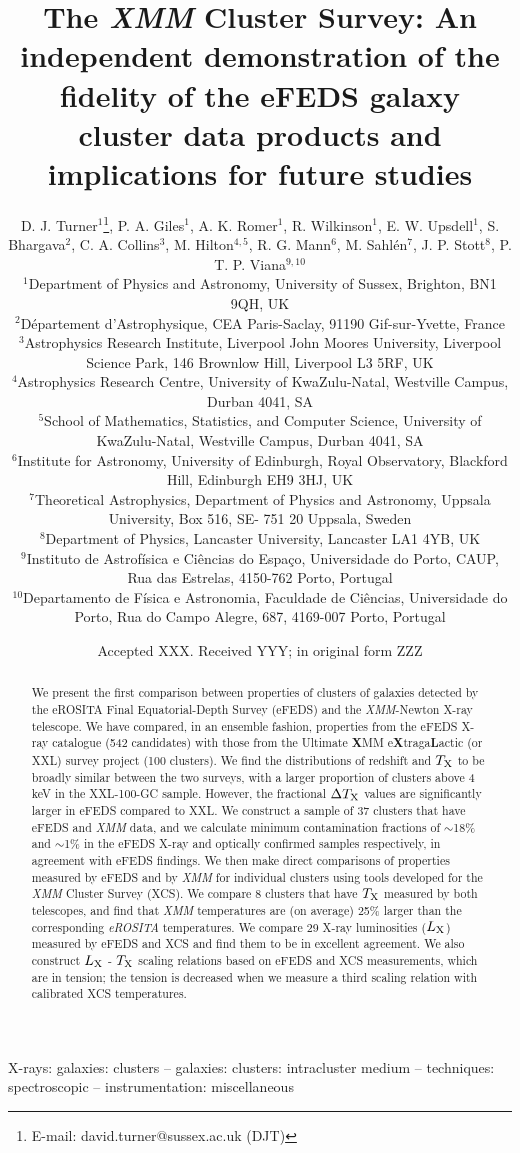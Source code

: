 \documentclass[fleqn,usenatbib]{mnras}
\title[XCS: Demonstrating the fidelity of eFEDS data products when applied to clusters of galaxies]{The {\em XMM} Cluster Survey: An independent demonstration of the fidelity of the eFEDS galaxy cluster data products and implications for future studies}
\author[D. J. Turner et al.]
{D. J. Turner$^{1}$\thanks{E-mail: david.turner@sussex.ac.uk (DJT)}\orcidA{},
P. A. Giles$^{1}$\orcidB{},
A. K. Romer$^{1}$\orcidC{},
R. Wilkinson$^{1}$\orcidD{},
E. W. Upsdell$^{1}$\orcidG{},
S. Bhargava$^{2}$,
\newauthor
C. A. Collins$^{3}$,
M. Hilton$^{4,5}$\orcidJ{},
R. G. Mann$^{6}$\orcidH{},
M. Sahl\'en$^{7}$\orcidI{},
J. P. Stott$^{8}$\orcidF{},
P. T. P. Viana$^{9,10}$\orcidE{}
\\
$^{1}$Department of Physics and Astronomy, University of Sussex, Brighton, BN1 9QH, UK\\
$^{2}$Département d’Astrophysique, CEA Paris-Saclay, 91190 Gif-sur-Yvette, France\\
$^{3}$Astrophysics Research Institute, Liverpool John Moores University, Liverpool Science Park, 146 Brownlow Hill, Liverpool L3 5RF, UK \\
$^{4}$Astrophysics Research Centre, University of KwaZulu-Natal, Westville Campus, Durban 4041, SA \\
$^{5}$School of Mathematics, Statistics, and Computer Science, University of KwaZulu-Natal, Westville Campus, Durban 4041, SA \\
$^{6}$Institute for Astronomy, University of Edinburgh, Royal Observatory, Blackford Hill, Edinburgh EH9 3HJ, UK \\
$^{7}$Theoretical Astrophysics, Department of Physics and Astronomy, Uppsala University, Box 516, SE- 751 20 Uppsala, Sweden\\
$^{8}$Department of Physics, Lancaster University, Lancaster LA1 4YB, UK \\
$^{9}$Instituto de Astrof\'isica e Ci\^{e}ncias do Espa\c co, Universidade do Porto, CAUP, Rua das Estrelas, 4150-762 Porto, Portugal \\
$^{10}$Departamento de F\'isica e Astronomia, Faculdade de Ci\^{e}ncias, Universidade do Porto, Rua do Campo Alegre, 687, 4169-007 Porto, Portugal \\
}
\date{Accepted XXX. Received YYY; in original form ZZZ}
\begin{document}
\label{firstpage}
\pagerange{\pageref{firstpage}--\pageref{lastpage}}
\maketitle

\begin{abstract}
We present the first comparison between properties of clusters of galaxies detected by the eROSITA Final Equatorial-Depth Survey (eFEDS) and the {\em XMM}-Newton X-ray telescope. We have compared, in an ensemble fashion, properties from the eFEDS X-ray catalogue (542 candidates) with those from the Ultimate {\bf X}MM e{\bf X}traga{\bf L}actic (or XXL) survey project (100 clusters). We find the distributions of redshift and $T_{\rm X}$ to be broadly similar between the two surveys, with a larger proportion of clusters above 4\,keV in the XXL-100-GC sample. However, the fractional $\Delta T_{\rm X}$ values are significantly larger in eFEDS compared to XXL.
We construct a sample of 37 clusters that have eFEDS and {\em XMM} data, and we calculate minimum contamination fractions of ${\sim}$18\% and ${\sim}$1\% in the eFEDS X-ray and optically confirmed samples respectively, in agreement with eFEDS findings.
We then make direct comparisons of properties measured by eFEDS and by {\em XMM} for individual clusters using tools developed for the {\em XMM} Cluster Survey (XCS). We compare 8 clusters that have $T_{\rm X}$ measured by both telescopes, and find that {\em XMM} temperatures are (on average) 25\% larger than the corresponding {\em eROSITA} temperatures. We compare 29 X-ray luminosities ($L_{\rm X}$) measured by eFEDS and XCS and find them to be in excellent agreement.  We also construct $L_{\rm X}$ - $T_{\rm X}$ scaling relations based on eFEDS and XCS measurements, which are in tension; the tension is decreased when we measure a third scaling relation with calibrated XCS temperatures.

\end{abstract}

\begin{keywords}
X-rays: galaxies: clusters -- galaxies: clusters: intracluster medium -- techniques: spectroscopic -- instrumentation: miscellaneous
\end{keywords}
\end{document}
